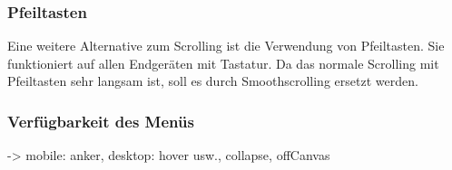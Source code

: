 \subsubsection{Pfeiltasten}
Eine weitere Alternative zum Scrolling ist die Verwendung von Pfeiltasten. Sie funktioniert auf allen Endgeräten mit Tastatur. Da das normale Scrolling mit Pfeiltasten sehr langsam ist, soll es durch Smoothscrolling ersetzt werden.
\subsubsection{Verfügbarkeit des Menüs}
 -> mobile: anker, desktop: hover usw., collapse, offCanvas
